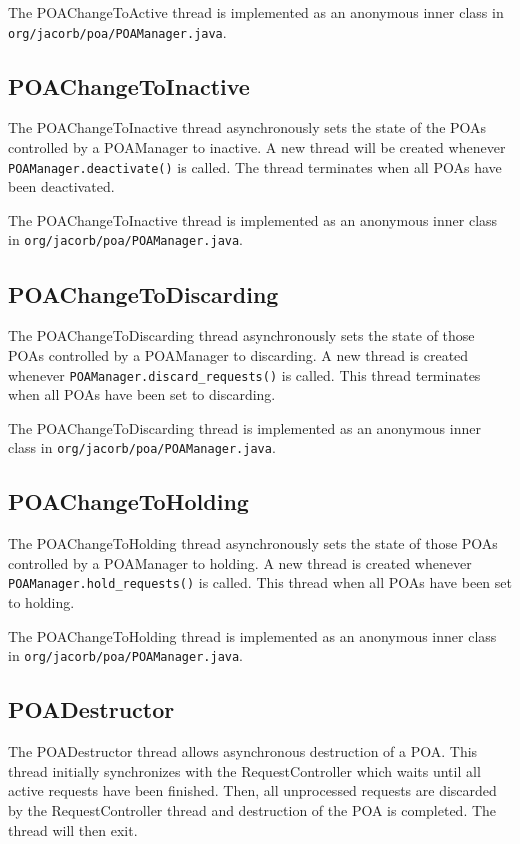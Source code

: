 The POAChangeToActive thread is implemented as an anonymous inner class in
{\tt org/jacorb/poa/POAManager.java}.

\subsection*{POAChangeToInactive}
The POAChangeToInactive thread asynchronously sets the state of the POAs
controlled by a POAManager to inactive. A new thread will be created whenever
{\tt POAManager.deactivate()} is called. The thread terminates when all
POAs have been deactivated.

The POAChangeToInactive thread is implemented as an anonymous inner class in
{\tt org/jacorb/poa/POAManager.java}.

\subsection*{POAChangeToDiscarding}
The POAChangeToDiscarding thread asynchronously sets the state of those POAs
controlled by a POAManager to discarding. A new thread is created whenever
{\tt POAManager.discard\_requests()} is called. This thread terminates when
all POAs have been set to discarding.

The POAChangeToDiscarding thread is implemented as an anonymous inner class in
{\tt org/jacorb/poa/POAManager.java}.

\subsection*{POAChangeToHolding}
The POAChangeToHolding thread asynchronously sets the state of those POAs
controlled by a POAManager to holding. A new thread is created whenever
{\tt POAManager.hold\_requests()} is called. This thread when all POAs have
been set to holding.

The POAChangeToHolding thread is implemented as an anonymous inner class in
{\tt org/jacorb/poa/POAManager.java}.

\subsection*{POADestructor}
The POADestructor thread allows asynchronous destruction of a POA. This thread
initially synchronizes with the RequestController which waits until all active
requests have been finished. Then, all unprocessed requests are discarded
by the RequestController thread and destruction of the POA is completed. The
thread will then exit.

